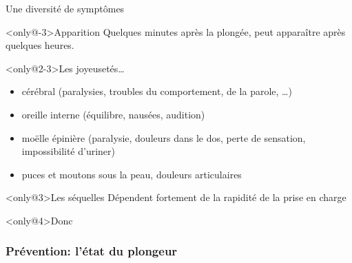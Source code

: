 \begin{frame}{Une diversité de symptômes}
\begin{block}<only@-3>{Apparition}
%
Quelques minutes après la plongée,
peut apparaître après quelques heures.
\end{block}

\begin{block}<only@2-3>{Les joyeusetés\dots}
%
\begin{itemize}
\item cérébral (paralysies, troubles du comportement, de la parole, \dots)
\item oreille interne (équilibre, nausées, audition)
\item moëlle épinière (paralysie, douleurs dans le dos, perte de sensation, impossibilité d'uriner)
\item puces et moutons sous la peau, douleurs articulaires
\end{itemize}
\end{block}

\begin{block}<only@3>{Les séquelles}
Dépendent fortement de la rapidité de la prise en charge
\end{block}

\begin{alertblock}<only@4>{Donc}
\Huge\centering
{}
\end{alertblock}
\end{frame}

\subsubsection{Prévention: l'état du plongeur}

